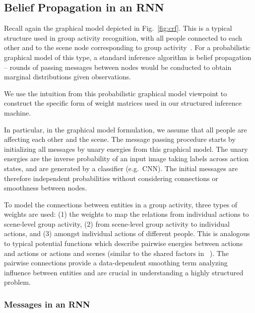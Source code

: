 \documentclass[10pt,twocolumn,letterpaper]{article}
\begin{document}
\subsection{Belief Propagation in an RNN}





Recall again the graphical model depicted in Fig.~\ref{fig:crf}.  This is a typical structure used in group activity recognition, with all people connected to each other and to the scene node corresponding to group activity~\cite{LanWYRM12,LanWYM10}.  For a probabilistic graphical model of this type, a standard inference algorithm is belief propagation -- rounds of passing messages between nodes would be conducted to obtain marginal distributions given observations.

We use the intuition from this probabilistic graphical model viewpoint to construct the specific form of weight matrices used in our structured inference machine.

In particular, in the graphical model formulation, we assume that all people are affecting each other and the scene. 
The message passing procedure starts by initializing all messages by unary energies from this graphical model. The unary energies are the inverse probability of an input image taking labels across action states, and are generated by a classifier (e.g.\ CNN). The initial messages are therefore independent probabilities without considering connections or smoothness between nodes. 

To model the connections between entities in a group activity, three types of weights are used: (1) the weights to map the relations from individual actions to scene-level group activity, (2) from scene-level group activity to individual actions, and (3) amongst individual actions of different people. This is analogous to typical potential functions which describe pairwise energies between actions and actions or actions and scenes (similar to the shared factors in ~\cite{DengZCLMRM15}). The pairwise connections provide a data-dependent smoothing term analyzing influence between entities and are crucial in understanding a highly structured problem.




\vspace{-5mm}

\subsubsection{Messages in an RNN}
\end{document}
